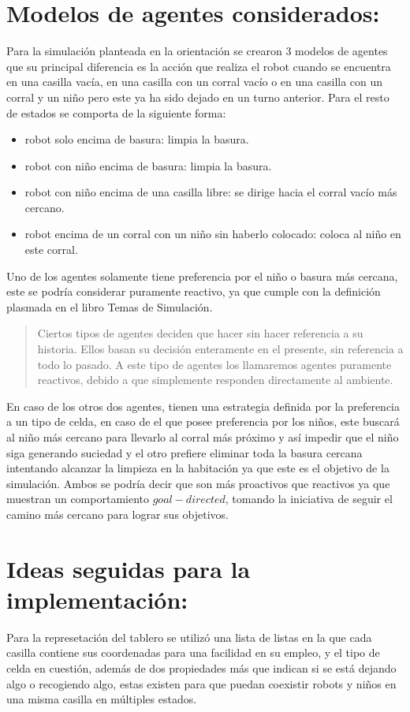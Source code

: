 \documentclass[titlepage,11pt]{scrartcl}
\begin{document}
\section{Modelos de agentes considerados:}
Para la simulación planteada en la orientación se crearon 3 modelos de agentes que su principal diferencia es la acción que realiza el robot cuando se encuentra en una casilla vacía, en una casilla con un corral vacío o en una casilla con un corral y un niño pero este ya ha sido dejado en un turno anterior. Para el resto de estados se comporta de la siguiente forma:
\begin{itemize}
    \item robot solo encima de basura: limpia la basura.
    \item robot con niño encima de basura: limpia la basura.
    \item robot con niño encima de una casilla libre: se dirige hacia el corral vacío más cercano.
    \item robot encima de un corral con un niño sin haberlo colocado: coloca al niño en este corral.
\end{itemize}
Uno de los agentes solamente tiene preferencia por el niño o basura más cercana, este se podría considerar puramente reactivo, ya que cumple con la definición plasmada en el libro Temas de Simulación.
\begin{quotation}
    Ciertos tipos de agentes deciden que hacer sin hacer referencia a su historia. Ellos basan su decisión enteramente en el presente, sin referencia a todo lo pasado. A este tipo de agentes los llamaremos agentes puramente reactivos, debido a que simplemente responden directamente al ambiente.
\end{quotation}
En caso de los otros dos agentes, tienen una estrategia definida por la preferencia a un tipo de celda, en caso de el que posee preferencia por los niños, este buscará al niño más cercano para llevarlo al corral más próximo y así impedir que el niño siga generando suciedad y el otro prefiere eliminar toda la basura cercana intentando alcanzar la limpieza en la habitación ya que este es el objetivo de la simulación. Ambos se podría decir que son más proactivos que reactivos ya que muestran un comportamiento $goal-directed$, tomando la iniciativa de seguir el camino más cercano para lograr sus objetivos.


\section{Ideas seguidas para la implementación:}
Para la represetación del tablero se utilizó una lista de listas en la que cada casilla contiene sus coordenadas para una facilidad en su empleo, y el tipo de celda en cuestión, además de dos propiedades más que indican si se está dejando algo o recogiendo algo, estas existen para que puedan coexistir robots y niños en una misma casilla en múltiples estados.
\end{document}
